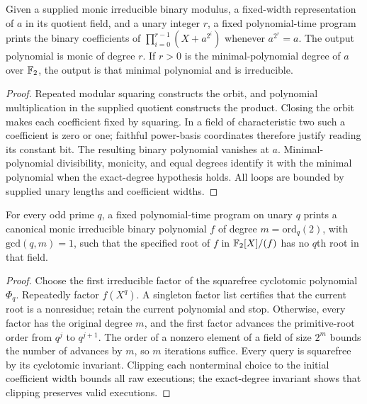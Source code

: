 \begin{lemma}
\label{lem:binary-orbit-polynomial}
\leanok
Given a supplied monic irreducible binary modulus, a fixed-width representation
of $a$ in its quotient field, and a unary integer $r$, a fixed polynomial-time
program prints the binary coefficients of
$\prod_{i=0}^{r-1}(X+a^{2^i})$ whenever $a^{2^r}=a$.
The output polynomial is monic of degree $r$. If $r>0$ is the minimal-polynomial
degree of $a$ over $\mathbb{F}_2$, the output is that minimal polynomial and is irreducible.
\end{lemma}
\begin{proof}
\leanok
Repeated modular squaring constructs the orbit, and polynomial multiplication
in the supplied quotient constructs the product. Closing the orbit makes each
coefficient fixed by squaring. In a field of characteristic two such a
coefficient is zero or one; faithful power-basis coordinates therefore justify
reading its constant bit. The resulting binary polynomial vanishes at $a$.
Minimal-polynomial divisibility, monicity, and equal degrees identify it with
the minimal polynomial when the exact-degree hypothesis holds. All loops are
bounded by supplied unary lengths and coefficient widths.
\end{proof}

\begin{lemma}
\label{lem:binary-odd-prime-nonresidue}
\leanok
For every odd prime $q$, a fixed polynomial-time program on unary $q$ prints a
canonical monic irreducible binary polynomial $f$ of degree
$m=\mathrm{ord}_q(2)$, with $\mathrm{gcd}(q,m)=1$, such that the specified root of
$f$ in $\mathbb{F}_2[X]/(f)$ has no $q$th root in that field.
\end{lemma}
\begin{proof}
\leanok
Choose the first irreducible factor of the squarefree cyclotomic polynomial
$\Phi_q$. Repeatedly factor $f(X^q)$. A singleton factor list certifies that the
current root is a nonresidue; retain the current polynomial and stop. Otherwise,
every factor has the original degree $m$, and the first factor advances the
primitive-root order from $q^j$ to $q^{j+1}$. The order of a nonzero element of a
field of size $2^m$ bounds the number of advances by $m$, so $m$ iterations
suffice. Every query is squarefree by its cyclotomic invariant. Clipping each
nonterminal choice to the initial coefficient width bounds all raw executions;
the exact-degree invariant shows that clipping preserves valid executions.
\end{proof}

